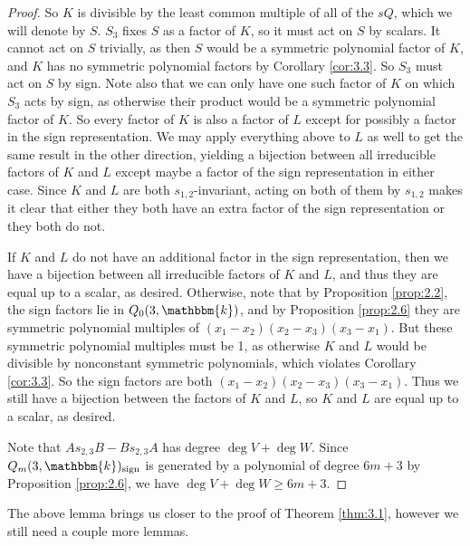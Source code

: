 \documentclass[11pt]{article}
\theoremstyle{definition}
\renewcommand{\k}{\mathbbm{k}}
\newcommand{\sgn}{\mathrm{sign}}
\begin{document}
\begin{proof}
    So $K$ is divisible by the least common multiple of all of the $sQ$, which we will denote by $S$. $S_3$ fixes $S$ as a factor of $K$, so it must act on $S$ by scalars. It cannot act on $S$ trivially, as then $S$ would be a symmetric polynomial factor of $K$, and $K$ has no symmetric polynomial factors by Corollary \ref{cor:3.3}. So $S_3$ must act on $S$ by sign. Note also that we can only have one such factor of $K$ on which $S_3$ acts by sign, as otherwise their product would be a symmetric polynomial factor of $K$. So every factor of $K$ is also a factor of $L$ except for possibly a factor in the sign representation. We may apply everything above to $L$ as well to get the same result in the other direction, yielding a bijection between all irreducible factors of $K$ and $L$ except maybe a factor of the sign representation in either case. Since $K$ and $L$ are both $s_{1,2}$-invariant, acting on both of them by $s_{1,2}$ makes it clear that either they both have an extra factor of the sign representation or they both do not.
    
    If $K$ and $L$ do not have an additional factor in the sign representation, then we have a bijection between all irreducible factors of $K$ and $L$, and thus they are equal up to a scalar, as desired. Otherwise, note that by Proposition \ref{prop:2.2}, the sign factors lie in $Q_0(3,\k)$, and by Proposition \ref{prop:2.6} they are symmetric polynomial multiples of $(x_1-x_2)(x_2-x_3)(x_3-x_1)$. But these symmetric polynomial multiples must be 1, as otherwise $K$ and $L$ would be divisible by nonconstant symmetric polynomials, which violates Corollary \ref{cor:3.3}. So the sign factors are both $(x_1-x_2)(x_2-x_3)(x_3-x_1)$. Thus we still have a bijection between the factors of $K$ and $L$, so $K$ and $L$ are equal up to a scalar, as desired.
    
    Note that $As_{2,3}B-Bs_{2,3}A$ has degree $\deg V+\deg W$. Since $Q_m(3,\k)_\sgn$ is generated by a polynomial of degree $6m+3$ by Proposition \ref{prop:2.6}, we have $\deg V+\deg W\geq 6m+3$.
\end{proof}

The above lemma brings us closer to the proof of Theorem \ref{thm:3.1}, however we still need a couple more lemmas.
\end{document}
